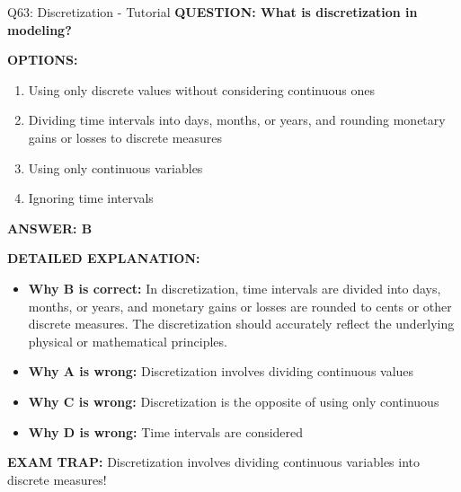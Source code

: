 \documentclass[8pt]{beamer}
\begin{document}
	\begin{frame}{Q63: Discretization - Tutorial}
		\fontsize{6.5}{7.5}\selectfont
		\textbf{QUESTION: What is discretization in modeling?}
		
		\vspace{0.1cm}
		\textbf{OPTIONS:}
		\begin{enumerate}
			\item Using only discrete values without considering continuous ones
			\item Dividing time intervals into days, months, or years, and rounding monetary gains or losses to discrete measures
			\item Using only continuous variables
			\item Ignoring time intervals
		\end{enumerate}
		
		\vspace{0.1cm}
		\textcolor{myblue}{\textbf{ANSWER: B}}
		
		\vspace{0.1cm}
		\textbf{DETAILED EXPLANATION:}
		\begin{itemize}
			\item \textbf{Why B is correct:} In discretization, time intervals are divided into days, months, or years, and monetary gains or losses are rounded to cents or other discrete measures. The discretization should accurately reflect the underlying physical or mathematical principles.
			\item \textbf{Why A is wrong:} Discretization involves dividing continuous values
			\item \textbf{Why C is wrong:} Discretization is the opposite of using only continuous
			\item \textbf{Why D is wrong:} Time intervals are considered
		\end{itemize}
		
		\textcolor{myred}{\textbf{EXAM TRAP:}} Discretization involves \textcolor{myblue}{dividing continuous variables into discrete measures}!
	\end{frame}
	
\end{document}
